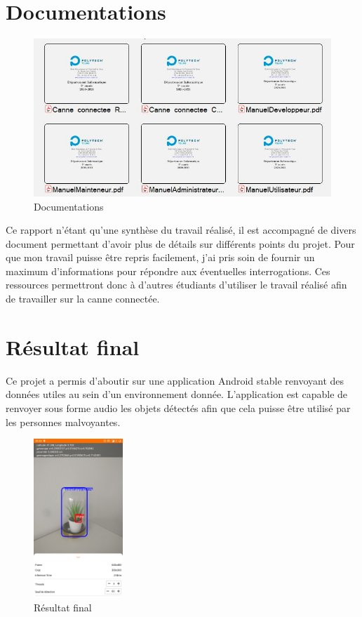 \documentclass[UTF8]{EPURapport}
\begin{document}
\section{Documentations}

\begin{figure}[h!]
\centering
  \includegraphics[width=\textwidth]{images/docs.JPG}
  \caption{Documentations}
  \label{fig:docs}
\end{figure}

Ce rapport n'étant qu'une synthèse du travail réalisé, il est accompagné de divers document permettant d'avoir plus de détails sur différents points du projet. Pour que mon travail puisse être repris facilement, j'ai pris soin de fournir un maximum d'informations pour répondre aux éventuelles interrogations. Ces ressources permettront donc à d'autres étudiants d'utiliser le travail réalisé afin de travailler sur la canne connectée.

\section{Résultat final}

Ce projet a permis d'aboutir sur une application Android stable renvoyant des données utiles au sein d'un environnement donnée. L'application est capable de renvoyer sous forme audio les objets détectés afin que cela puisse être utilisé par les personnes malvoyantes. 

\begin{figure}[h!]
\centering
  \includegraphics[width=0.3\textwidth]{images/result.jpg}
  \caption{Résultat final}
  \label{fig:result}
\end{figure}
\end{document}
